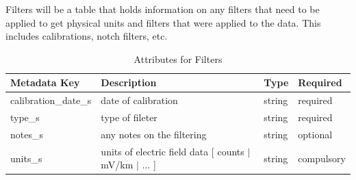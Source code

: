 \documentclass{article}
\begin{document}
Filters will be a table that holds information on any filters that need to be applied to get physical units and filters that were applied to the data.  This includes calibrations, notch filters, etc.  

\begin{table}[htb!]
	\caption[Attributes for Filter]{Attributes for Filters}
	\begin{tabular}{|l|p{3in}|l|l|}
		\hline
		\textbf{Metadata Key} & \textbf{Description} & \textbf{Type} & \textbf{Required} \\ \hline
		calibration\_date\_s & date of calibration & string &  required \\ \hline
		type\_s & type of fileter & string &  required \\ \hline
		notes\_s & any notes on the filtering & string &  optional \\ \hline
		units\_s & units of electric field data [ counts $|$ mV/km $|$ ... ] & string & compulsory \\ \hline
	\end{tabular}
	\label{tab:filter}
\end{table}
 
\end{document}
